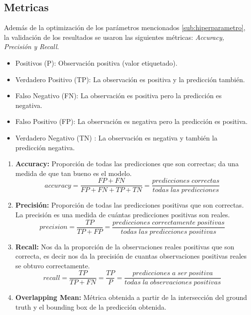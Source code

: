\subsection{Metricas}\label{sub:metricas}

Además de la optimización de los parámetros mencionados \ref{sub:hiperparametro}, la validación de los resultados se usaron las siguientes métricas: \textit{Accuracy, Precisión y Recall}.

\begin{itemize}
	\item Positivos (P): Observación positiva (valor etiquetado).
	\item Verdadero Positivo (TP): La observación es positiva y la predicción también.
	\item Falso Negativo (FN): La observación es positiva pero la predicción es negativa.
	\item Falso Positivo (FP): La observación es negativa pero la predicción es positiva.
	\item Verdadero Negativo (TN) :  La observación es negativa y también la predicción negativa.
\end{itemize}

\begin{enumerate}
\item \textbf{Accuracy:} Proporción de todas las predicciones que son correctas; da una medida de que tan bueno es el modelo.
\begin{equation}
accuracy = \frac{FP+FN}{FP+FN+TP+TN}=\frac{predicciones\;correctas}{todas\;las\;predicciones}
\end{equation}

\item \textbf{Precisión:} Proporción de todas las predicciones positivas que son correctas. La precisión es una medida de cuántas predicciones positivas son reales.
\begin{equation}
precision=\frac{TP}{TP+FP}= \frac{predicciones\;correctamente\;positivas}{todas\;las\;predicciones\;positivas}
\end{equation}

\item \textbf{Recall:} Nos da la proporción de la observaciones reales positivas que son correcta, es decir nos da la precisión de cuantas observaciones positivas reales se obtuvo correctamente.
\begin{equation}
recall = \frac{TP}{TP+FN} = \frac{TP}{P} = \frac{predicciones\;a\;ser\;positiva}{todas\;la\;observaciones\;positivas} 
\end{equation}

\item \textbf{Overlapping Mean:} Métrica obtenida a partir de la intersección del ground truth y el bounding box de la predicción obtenida.

\end{enumerate}


